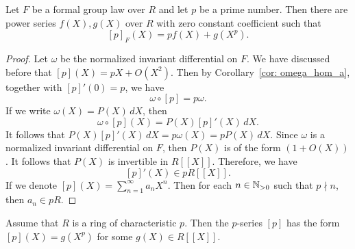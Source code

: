\begin{corollary}
    Let $F$ be a formal group law over $R$ and let $p$ be a prime number. Then there are power series
    $f(X), g(X)$ over $R$ with zero constant coefficient such that
    \[ [p]_F (X) = pf(X) + g(X^p). \]

    \label{cor: p_series_form}
\end{corollary}

\begin{proof}
    Let $\omega$ be the normalized invariant differential on $F$. We have discussed before
    that $[p](X) = pX + O(X^2)$. Then by Corollary~\ref{cor: omega_hom_a},
    together with $[p]'(0) = p$, we have
    \[ \omega \circ [p] = p \omega. \]
    If we write $\omega(X) = P(X) \, dX$, then
    \[\omega \circ [p] (X) = P(X) [p]'(X) \, dX. \]
    It follows that $P(X) [p]'(X) \, dX = p \omega(X) = p P(X)\, dX. $
    Since $\omega$ is a normalized invariant differential on $F$, then $P(X)$ is of the
    form $(1 + O(X))$. It follows that $P(X)$ is invertible in
    $R[\![X]\!]$. Therefore, we have
    \[[p]'(X) \in p R[\![X]\!]. \]
    If we denote $[p](X) = \sum_{n=1}^{\infty} a_n X ^ n$. Then for each $n \in \mathbb{N}_{>0}$
    such that $p \nmid n$, then $a_n \in p R$.
\end{proof}

\begin{example}
    Assume that $R$ is a ring of characteristic $p$. Then the $p$-series $[p]$ has the form
    $[p](X) = g(X ^ p)$ for some $g(X) \in R [\![X]\!]$.
\end{example}